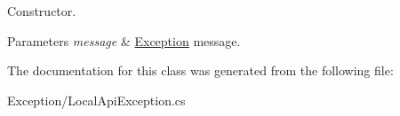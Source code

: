 Constructor. 


\begin{DoxyParams}{Parameters}
{\em message} & \hyperlink{namespace_thecallr_api_1_1_exception}{Exception} message.\\
\hline
\end{DoxyParams}


The documentation for this class was generated from the following file\+:\begin{DoxyCompactItemize}
\item 
Exception/Local\+Api\+Exception.\+cs\end{DoxyCompactItemize}

